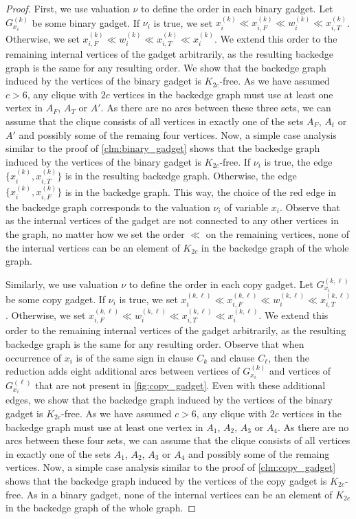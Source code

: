 \documentclass[a4paper,USenglish,cleveref,autoref,thm-restate,pdfa]{lipics-v2021}
\begin{document}
\begin{proof}
    First, we use valuation $\nu$ to define the order in each binary gadget.
    Let $G_{x_i}^{(k)}$ be some binary gadget.
    If $\nu_i$ is true, we set $x_i^{(k)} \ll x_{i,F}^{(k)} \ll w_i^{(k)} \ll x_{i,T}^{(k)}$.
    Otherwise, we set $x_{i,F}^{(k)} \ll w_i^{(k)} \ll x_{i,T}^{(k)} \ll x_i^{(k)}$.
    We extend this order to the remaining internal vertices of the gadget arbitrarily, as the resulting backedge graph is the same for any resulting order.
    We show that the backedge graph induced by the vertices of the binary gadget is $K_{2c}$-free.
    As we have assumed $c>6$, any clique with $2c$ vertices in the backedge graph must use at least one vertex in $A_F$, $A_T$ or $A'$.
    As there are no arcs between these three sets, we can assume that the clique consists of all vertices in exactly one of the sets $A_F$, $A_t$ or $A'$ and possibly some of the remaing four vertices.
    Now, a simple case analysis similar to the proof of \cref{clm:binary_gadget} shows that the backedge graph induced by the vertices of the binary gadget is $K_{2c}$-free.
    If $\nu_i$ is true, the edge $\{x_i^{(k)}, x_{i,T}^{(k)}\}$ is in the resulting backedge graph.
    Otherwise, the edge $\{x_i^{(k)}, x_{i,F}^{(k)}\}$ is in the backedge graph.
    This way, the choice of the red edge in the backedge graph corresponds to the valuation $\nu_i$ of variable $x_i$.
    Observe that as the internal vertices of the gadget are not connected to any other vertices in the graph, no matter how we set the order $\ll$ on the remaining vertices, none of the internal vertices can be an element of $K_{2c}$ in the backedge graph of the whole graph.

    Similarly, we use valuation $\nu$ to define the order in each copy gadget.
    Let $G_{x_i}^{(k,\ell)}$ be some copy gadget.
    If $\nu_i$ is true, we set $x_i^{(k,\ell)} \ll x_{i,F}^{(k,\ell)} \ll w_i^{(k,\ell)} \ll x_{i,T}^{(k,\ell)}$.
    Otherwise, we set $x_{i,F}^{(k,\ell)} \ll w_i^{(k,\ell)} \ll x_{i,T}^{(k,\ell)} \ll x_i^{(k,\ell)}$.
    We extend this order to the remaining internal vertices of the gadget arbitrarily, as the resulting backedge graph is the same for any resulting order.
    Observe that when occurrence of $x_i$ is of the same sign in clause $C_k$ and clause $C_\ell$, then the reduction adds eight additional arcs between vertices of $G_{x_i}^{(k)}$ and vertices of $G_{x_i}^{(\ell)}$ that are not present in \cref{fig:copy_gadget}.
    Even with these additional edges, we show that the backedge graph induced by the vertices of the binary gadget is $K_{2c}$-free.
    As we have assumed $c>6$, any clique with $2c$ vertices in the backedge graph must use at least one vertex in $A_1$, $A_2$, $A_3$ or $A_4$.
    As there are no arcs between these four sets, we can assume that the clique consists of all vertices in exactly one of the sets $A_1$, $A_2$, $A_3$ or $A_4$ and possibly some of the remaing vertices.
    Now, a simple case analysis similar to the proof of \cref{clm:copy_gadget} shows that the backedge graph induced by the vertices of the copy gadget is $K_{2c}$-free.
    As in a binary gadget, none of the internal vertices can be an element of $K_{2c}$ in the backedge graph of the whole graph.


\end{proof}
\end{document}
